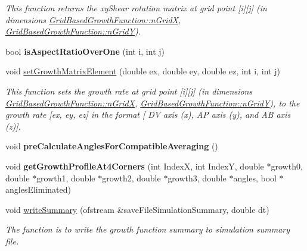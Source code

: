 \begin{DoxyCompactItemize}
\begin{DoxyCompactList}\small\item\em This function returns the xy\+Shear rotation matrix at grid point \mbox{[}i\mbox{]}\mbox{[}j\mbox{]} (in dimensions \hyperlink{classGridBasedGrowthFunction_af872b9963f3a579dcd615c23bcb58a86}{Grid\+Based\+Growth\+Function\+::n\+Grid\+X}, \hyperlink{classGridBasedGrowthFunction_a625bc963a1f1e7d1f1a35dbd0ef51728}{Grid\+Based\+Growth\+Function\+::n\+Grid\+Y}). \end{DoxyCompactList}\item 
\hypertarget{classGridBasedGrowthFunction_ab07937a18f72f31f4875225c1e246032}{}bool {\bfseries is\+Aspect\+Ratio\+Over\+One} (int i, int j)\label{classGridBasedGrowthFunction_ab07937a18f72f31f4875225c1e246032}

\item 
\hypertarget{classGridBasedGrowthFunction_a9d01fcbba5732aad966659d4f64c145b}{}void \hyperlink{classGridBasedGrowthFunction_a9d01fcbba5732aad966659d4f64c145b}{set\+Growth\+Matrix\+Element} (double ex, double ey, double ez, int i, int j)\label{classGridBasedGrowthFunction_a9d01fcbba5732aad966659d4f64c145b}

\begin{DoxyCompactList}\small\item\em This function sets the growth rate at grid point \mbox{[}i\mbox{]}\mbox{[}j\mbox{]} (in dimensions \hyperlink{classGridBasedGrowthFunction_af872b9963f3a579dcd615c23bcb58a86}{Grid\+Based\+Growth\+Function\+::n\+Grid\+X}, \hyperlink{classGridBasedGrowthFunction_a625bc963a1f1e7d1f1a35dbd0ef51728}{Grid\+Based\+Growth\+Function\+::n\+Grid\+Y}), to the growth rate \mbox{[}ex, ey, ez\mbox{]} in the format \mbox{[} D\+V axis (x), A\+P axis (y), and A\+B axis (z)\mbox{]}. \end{DoxyCompactList}\item 
\hypertarget{classGridBasedGrowthFunction_a92f4db6ab17ba3539f98895c500ec2d7}{}void {\bfseries pre\+Calculate\+Angles\+For\+Compatible\+Averaging} ()\label{classGridBasedGrowthFunction_a92f4db6ab17ba3539f98895c500ec2d7}

\item 
\hypertarget{classGridBasedGrowthFunction_a11692e47b20e812fe775f99a78480571}{}void {\bfseries get\+Growth\+Profile\+At4\+Corners} (int Index\+X, int Index\+Y, double $\ast$growth0, double $\ast$growth1, double $\ast$growth2, double $\ast$growth3, double $\ast$angles, bool $\ast$angles\+Eliminated)\label{classGridBasedGrowthFunction_a11692e47b20e812fe775f99a78480571}

\item 
void \hyperlink{classGridBasedGrowthFunction_a659418841b4a3bc8be1dec15f95d7b76}{write\+Summary} (ofstream \&save\+File\+Simulation\+Summary, double dt)
\begin{DoxyCompactList}\small\item\em The function is to write the growth function summary to simulation summary file. \end{DoxyCompactList}\end{DoxyCompactItemize}
